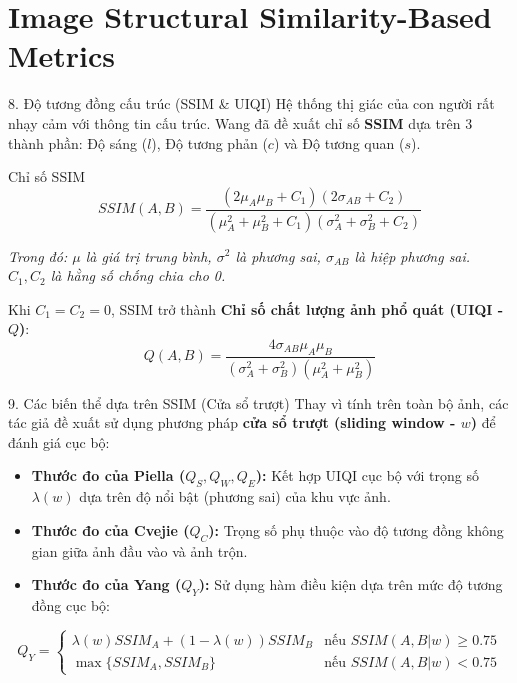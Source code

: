 \documentclass{beamer}
\begin{document}
\section{Image Structural Similarity-Based Metrics}

\begin{frame}{8. Độ tương đồng cấu trúc (SSIM \& UIQI)}
    Hệ thống thị giác của con người rất nhạy cảm với thông tin cấu trúc. Wang đã đề xuất chỉ số \textbf{SSIM} dựa trên 3 thành phần: Độ sáng ($l$), Độ tương phản ($c$) và Độ tương quan ($s$).

    \begin{block}{Chỉ số SSIM}
    \begin{equation}
        SSIM(A,B) = \frac{(2\mu_A\mu_B + C_1)(2\sigma_{AB} + C_2)}{(\mu_A^2 + \mu_B^2 + C_1)(\sigma_A^2 + \sigma_B^2 + C_2)}
    \end{equation}
    \end{block}
    \textit{Trong đó: $\mu$ là giá trị trung bình, $\sigma^2$ là phương sai, $\sigma_{AB}$ là hiệp phương sai. $C_1, C_2$ là hằng số chống chia cho 0.}

    \vspace{0.3cm}
    Khi $C_1 = C_2 = 0$, SSIM trở thành \textbf{Chỉ số chất lượng ảnh phổ quát (UIQI - $Q$)}:
    \begin{equation}
        Q(A,B) = \frac{4\sigma_{AB}\mu_A\mu_B}{(\sigma_A^2 + \sigma_B^2)(\mu_A^2 + \mu_B^2)}
    \end{equation}
\end{frame}

\begin{frame}{9. Các biến thể dựa trên SSIM (Cửa sổ trượt)}
    Thay vì tính trên toàn bộ ảnh, các tác giả đề xuất sử dụng phương pháp \textbf{cửa sổ trượt (sliding window - $w$)} để đánh giá cục bộ:

    \begin{itemize}
        \item \textbf{Thước đo của Piella ($Q_S, Q_W, Q_E$):} Kết hợp UIQI cục bộ với trọng số $\lambda(w)$ dựa trên độ nổi bật (phương sai) của khu vực ảnh.
        \item \textbf{Thước đo của Cvejie ($Q_C$):} Trọng số phụ thuộc vào độ tương đồng không gian giữa ảnh đầu vào và ảnh trộn.
        \item \textbf{Thước đo của Yang ($Q_Y$):} Sử dụng hàm điều kiện dựa trên mức độ tương đồng cục bộ:
    \end{itemize}

    \begin{equation}
    Q_Y =
    \begin{cases}
      \lambda(w) SSIM_A + (1-\lambda(w)) SSIM_B & \text{nếu } SSIM(A,B|w) \ge 0.75 \\
      \max \{SSIM_A, SSIM_B\} & \text{nếu } SSIM(A,B|w) < 0.75
   \end{cases}
   \end{equation}
\end{frame}
\end{document}
